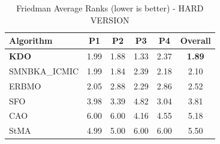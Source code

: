\begin{table}[htbp]
\centering
\caption{Friedman Average Ranks (lower is better) - HARD VERSION}
\label{tab:friedman_ranks}
\small
\begin{tabular}{lccccc}
\toprule
\textbf{Algorithm} & \textbf{P1} & \textbf{P2} & \textbf{P3} & \textbf{P4} & \textbf{Overall} \\
\midrule
\textbf{KDO} & 1.99 & 1.88 & 1.33 & 2.37 & \textbf{1.89} \\
SMNBKA_ICMIC & 1.99 & 1.84 & 2.39 & 2.18 & 2.10 \\
ERBMO & 2.05 & 2.88 & 2.29 & 2.86 & 2.52 \\
SFO & 3.98 & 3.39 & 4.82 & 3.04 & 3.81 \\
CAO & 6.00 & 6.00 & 4.16 & 4.55 & 5.18 \\
StMA & 4.99 & 5.00 & 6.00 & 6.00 & 5.50 \\
\bottomrule
\end{tabular}
\end{table}

